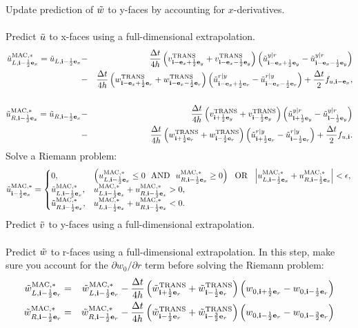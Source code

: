 Update prediction of $\tilde{w}$ to y-faces by accounting for $x$-derivatives. \\ \\
Predict $\tilde{u}$ to x-faces using a full-dimensional extrapolation.
\begin{eqnarray}
\tilde{u}_{L,{\bf i}-\frac{1}{2}{\bf e}_x}^{\rm MAC,*} = \tilde{u}_{L,{\bf i}-\frac{1}{2}{\bf e}_x} &-& \frac{\Delta t}{4h}\left(v_{{\bf i}-{\bf e}_x+\frac{1}{2}{\bf e}_y}^{\rm TRANS}+v_{{\bf i}-{\bf e}_x-\frac{1}{2}{\bf e}_y}^{\rm TRANS}\right)\left(\tilde{u}_{{\bf i}-{\bf e}_x+\frac{1}{2}{\bf e}_y}^{y|r}-\tilde{u}_{{\bf i}-{\bf e}_x-\frac{1}{2}{\bf e}_y}^{y|r}\right) \nonumber \\
&-& \frac{\Delta t}{4h}\left(w_{{\bf i}-{\bf e}_x+\frac{1}{2}{\bf e}_r}^{\rm TRANS}+w_{{\bf i}-{\bf e}_x-\frac{1}{2}{\bf e}_r}^{\rm TRANS}\right)\left(\tilde{u}_{{\bf i}-{\bf e}_x+\frac{1}{2}{\bf e}_r}^{r|y}-\tilde{u}_{{\bf i}-{\bf e}_x-\frac{1}{2}{\bf e}_r}^{r|y}\right) + \frac{\Delta t}{2}f_{u,{\bf i}-{\bf e}_x}, \nonumber \\
&& \\
\tilde{u}_{R,{\bf i}-\frac{1}{2}{\bf e}_x}^{\rm MAC,*} = \tilde{u}_{R,{\bf i}-\frac{1}{2}{\bf e}_x} &-& \frac{\Delta t}{4h}\left(v_{{\bf i}+\frac{1}{2}{\bf e}_y}^{\rm TRANS}+v_{{\bf i}-\frac{1}{2}{\bf e}_y}^{\rm TRANS}\right)\left(\tilde{u}_{{\bf i}+\frac{1}{2}{\bf e}_y}^{y|r}-\tilde{u}_{{\bf i}-\frac{1}{2}{\bf e}_y}^{y|r}\right) \nonumber \\
&-& \frac{\Delta t}{4h}\left(w_{{\bf i}+\frac{1}{2}{\bf e}_r}^{\rm TRANS}+w_{{\bf i}-\frac{1}{2}{\bf e}_r}^{\rm TRANS}\right)\left(\tilde{u}_{{\bf i}+\frac{1}{2}{\bf e}_r}^{r|y}-\tilde{u}_{{\bf i}-\frac{1}{2}{\bf e}_r}^{r|y}\right) + \frac{\Delta t}{2}f_{u,{\bf i}}.
\end{eqnarray}
Solve a Riemann problem:
\begin{equation}
\tilde{u}_{{\bf i}-\frac{1}{2}{\bf e}_x}^{\rm MAC,*} =
\begin{cases}
0, & \left(u_{L,{\bf i}-\frac{1}{2}{\bf e}_x}^{\rm MAC,*} \le 0 ~~ {\rm AND} ~~ u_{R,{\bf i}-\frac{1}{2}{\bf e}_x}^{\rm MAC,*} \ge 0\right) ~~ {\rm OR} ~~ \left|u_{L,{\bf i}-\frac{1}{2}{\bf e}_x}^{\rm MAC,*} + u_{R,{\bf i}-\frac{1}{2}{\bf e}_x}^{\rm MAC,*}\right| < \epsilon, \\
\tilde{u}_{L,{\bf i}-\frac{1}{2}{\bf e}_x}^{\rm MAC,*}, & u_{L,{\bf i}-\frac{1}{2}{\bf e}_x}^{\rm MAC,*} + u_{R,{\bf i}-\frac{1}{2}{\bf e}_x}^{\rm MAC,*} > 0, \\
\tilde{u}_{R,{\bf i}-\frac{1}{2}{\bf e}_x}^{\rm MAC,*}, & u_{L,{\bf i}-\frac{1}{2}{\bf e}_x}^{\rm MAC,*} + u_{R,{\bf i}-\frac{1}{2}{\bf e}_x}^{\rm MAC,*} < 0. 
\end{cases}
\end{equation}
Predict $\tilde{v}$ to y-faces using a full-dimensional extrapolation.\\ \\
Predict $\tilde{w}$ to r-faces using a full-dimensional extrapolation.  
In this step, make sure you account for the $\partial w_0/\partial r$ 
term before solving the Riemann problem:
\begin{eqnarray}
\tilde{w}_{L,{\bf i}-\frac{1}{2}{\bf e}_r}^{\rm MAC,*} &=& \tilde{w}_{L,{\bf i}-\frac{1}{2}{\bf e}_r}^{\rm MAC,*} - 
\frac{\Delta t}{4h}\left(\tilde{w}^{\rm TRANS}_{{\bf i}+\frac{1}{2}{\bf e}_r} + \tilde{w}^{\rm TRANS}_{{\bf i}-\frac{1}{2}{\bf e}_r}\right)\left(w_{0,{\bf i}+\frac{1}{2}{\bf e}_r}-w_{0,{\bf i}-\frac{1}{2}{\bf e}_r}\right) \\
\tilde{w}_{R,{\bf i}-\frac{1}{2}{\bf e}_r}^{\rm MAC,*} &=& \tilde{w}_{R,{\bf i}-\frac{1}{2}{\bf e}_r}^{\rm MAC,*} -
\frac{\Delta t}{4h}\left(\tilde{w}^{\rm TRANS}_{{\bf i}-\frac{1}{2}{\bf e}_r} + \tilde{w}^{\rm TRANS}_{{\bf i}-\frac{3}{2}{\bf e}_r}\right)\left(w_{0,{\bf i}-\frac{1}{2}{\bf e}_r}-w_{0,{\bf i}-\frac{3}{2}{\bf e}_r}\right)
\end{eqnarray}

